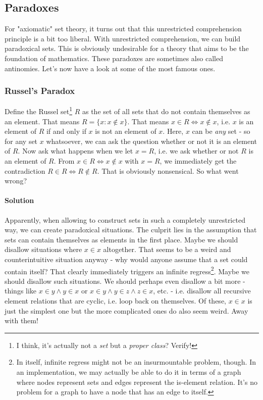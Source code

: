 \subsection{Paradoxes}
For "axiomatic" set theory, it turns out that this unrestricted comprehension principle is a bit too liberal. With unrestricted comprehension, we can build paradoxical sets. This is obviously undesirable for a theory that aims to be the foundation of mathematics. These paradoxes are sometimes also called antinomies. Let's now have a look at some of the most famous ones.

\subsubsection{Russel's Paradox}
Define the Russel set\footnote{I think, it's actually not a \emph{set} but a \emph{proper class}? Verify!} $R$ as the set of all sets that do not contain themselves as an element. That means $R = \{x: x \notin x\}$. That means $x \in R \Leftrightarrow x \notin x$, i.e. $x$ is an element of $R$ if and only if $x$ is not an element of $x$. Here, $x$ can be \emph{any} set - so for any set $x$ whatsoever, we can ask the question whether or not it is an element of $R$. Now ask what happens when we let $x = R$, i.e. we ask whether or not $R$ is an element of $R$. From $x \in R \Leftrightarrow x \notin x$ with $x = R$, we immediately get the contradiction $R \in R \Leftrightarrow R \notin R$. That is obviously nonsensical. So what went wrong?


\paragraph{Solution} Apparently, when allowing to construct sets in such a completely unrestricted way, we can create paradoxical situations. The culprit lies in the assumption that sets can contain themselves as elements in the first place. Maybe we should disallow situations where $x \in x$ altogether. That seems to be a weird and counterintuitive situation anyway - why would anyone assume that a set could contain itself? That clearly immediately triggers an infinite regress\footnote{In itself, infinite regress might not be an insurmountable problem, though. In an implementation, we may actually be able to do it in terms of a graph where nodes represent sets and edges represent the is-element relation. It's no problem for a graph to have a node that has an edge to itself.}. Maybe we should disallow such situations. We should perhaps even disallow a bit more - things like $x \in y \wedge y \in x$ or $x \in y \wedge y \in z \wedge z \in x$, etc. - i.e. disallow all recursive element relations that are cyclic, i.e. loop back on themselves. Of these, $x \in x$ is just the simplest one but the more complicated ones do also seem weird. Away with them!

